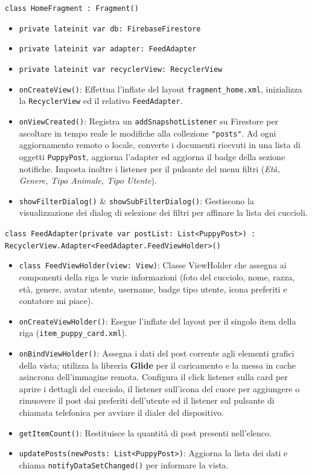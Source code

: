 \documentclass[a4paper]{report}
\begin{document}
\texttt{class HomeFragment : Fragment()}
\begin{itemize}
    \item \texttt{private lateinit var db: FirebaseFirestore}
    \item \texttt{private lateinit var adapter: FeedAdapter}
    \item \texttt{private lateinit var recyclerView: RecyclerView}
    \item \texttt{onCreateView()}: Effettua l'inflate del layout \texttt{fragment\_home.xml}, inizializza la \texttt{RecyclerView} ed il relativo \texttt{FeedAdapter}.
    \item \texttt{onViewCreated()}: Registra un \texttt{addSnapshotListener} su Firestore per ascoltare in tempo reale le modifiche alla collezione \texttt{"posts"}. Ad ogni aggiornamento remoto o locale, converte i documenti ricevuti in una lista di oggetti \texttt{PuppyPost}, aggiorna l'adapter ed aggiorna il badge della sezione notifiche. Imposta inoltre i listener per il pulsante del menu filtri (\textit{Età, Genere, Tipo Animale, Tipo Utente}).
    \item \texttt{showFilterDialog()} \& \texttt{showSubFilterDialog()}: Gestiscono la visualizzazione dei dialog di selezione dei filtri per affinare la lista dei cuccioli.
\end{itemize}

\texttt{class FeedAdapter(private var postList: List<PuppyPost>) : RecyclerView.Adapter<FeedAdapter.FeedViewHolder>()}
\begin{itemize}
    \item \texttt{class FeedViewHolder(view: View)}: Classe ViewHolder che assegna ai componenti della riga le varie informazioni (foto del cucciolo, nome, razza, età, genere, avatar utente, username, badge tipo utente, icona preferiti e contatore mi piace).
    \item \texttt{onCreateViewHolder()}: Esegue l'inflate del layout per il singolo item della riga (\texttt{item\_puppy\_card.xml}).
    \item \texttt{onBindViewHolder()}: Assegna i dati del post corrente agli elementi grafici della vista; utilizza la libreria \textbf{Glide} per il caricamento e la messa in cache asincrona dell'immagine remota. Configura il click listener sulla card per aprire i dettagli del cucciolo, il listener sull'icona del cuore per aggiungere o rimuovere il post dai preferiti dell'utente ed il listener sul pulsante di chiamata telefonica per avviare il dialer del dispositivo.
    \item \texttt{getItemCount()}: Restituisce la quantità di post presenti nell'elenco.
    \item \texttt{updatePosts(newPosts: List<PuppyPost>)}: Aggiorna la lista dei dati e chiama \texttt{notifyDataSetChanged()} per informare la vista.
\end{itemize}
\end{document}

